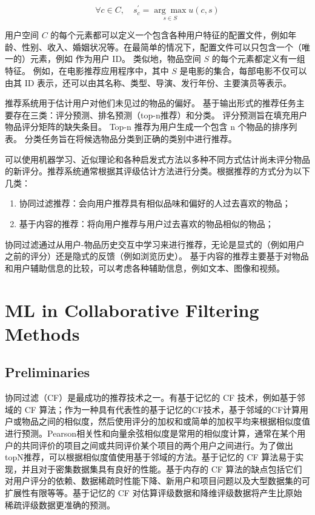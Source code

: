 \documentclass[sigconf]{acmart}
\begin{document}
\begin{equation}
\forall c \in C, \quad s_{c}^{\prime}=\underset{s \in S}{\arg \max } u(c, s)
\end{equation}

用户空间 $C$ 的每个元素都可以定义一个包含各种用户特征的配置文件，例如年龄、性别、收入、婚姻状况等。在最简单的情况下，配置文件可以只包含一个（唯一的）元素，例如 作为用户 ID。 类似地，物品空间 $S$ 的每个元素都定义有一组特征。 例如，在电影推荐应用程序中，其中 $S$ 是电影的集合，每部电影不仅可以由其 ID 表示，还可以由其名称、类型、导演、发行年份、主要演员等表示。

推荐系统用于估计用户对他们未见过的物品的偏好。 基于输出形式的推荐任务主要存在三类：评分预测、排名预测（top-n推荐）和分类。 评分预测旨在填充用户物品评分矩阵的缺失条目。 Top-n 推荐为用户生成一个包含 n 个物品的排序列表。 分类任务旨在将候选物品分类到正确的类别中进行推荐。

可以使用机器学习、近似理论和各种启发式方法以多种不同方式估计尚未评分物品的新评分。推荐系统通常根据其评级估计方法进行分类。根据推荐的方式分为以下几类\cite{balabanovic1997fab}：

\begin{enumerate}
  \item 协同过滤推荐：会向用户推荐具有相似品味和偏好的人过去喜欢的物品；
  \item 基于内容的推荐：将向用户推荐与用户过去喜欢的物品相似的物品；
\end{enumerate}

协同过滤通过从用户-物品历史交互中学习来进行推荐，无论是显式的（例如用户之前的评分）还是隐式的反馈（例如浏览历史）。 基于内容的推荐主要基于对物品和用户辅助信息的比较，可以考虑各种辅助信息，例如文本、图像和视频。

\section{ML in Collaborative Filtering Methods}

\subsection{Preliminaries}

协同过滤（CF）是最成功的推荐技术之一。有基于记忆的 CF 技术，例如基于邻域的 CF 算法；作为一种具有代表性的基于记忆的CF技术，基于邻域的CF计算用户或物品之间的相似度，然后使用评分的加权和或简单的加权平均来根据相似度值进行预测。Pearson相关性和向量余弦相似度是常用的相似度计算，通常在某个用户的共同评价的项目之间或共同评价某个项目的两个用户之间进行。为了做出topN推荐，可以根据相似度值使用基于邻域的方法。基于记忆的 CF 算法易于实现，并且对于密集数据集具有良好的性能。基于内存的 CF 算法的缺点包括它们对用户评分的依赖、数据稀疏时性能下降、新用户和项目问题以及大型数据集的可扩展性有限等等。基于记忆的 CF 对估算评级数据和降维评级数据将产生比原始稀疏评级数据更准确的预测。
\end{document}
